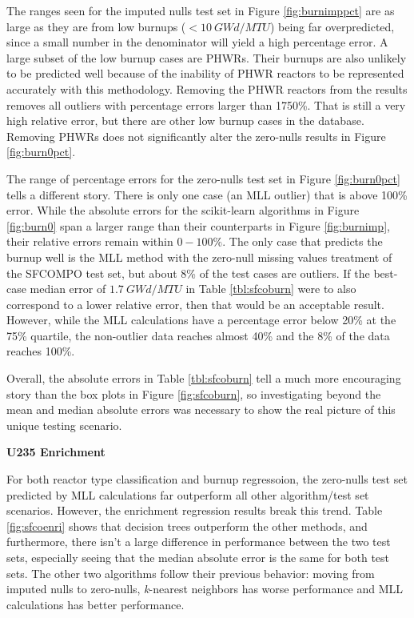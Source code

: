 The ranges seen for the imputed nulls test set in Figure \ref{fig:burnimppct}
are as large as they are from low burnups ($< 10\:GWd/MTU$) being far
overpredicted, since a small number in the denominator will yield a high
percentage error. A large subset of the low burnup cases are \gls{PHWR}s.
Their burnups are also unlikely to be predicted well because of the inability
of \gls{PHWR} reactors to be represented accurately with this methodology.
Removing the \gls{PHWR} reactors from the results removes all outliers with
percentage errors larger than 1750\%. That is still a very high relative error,
but there are other low burnup cases in the database.  Removing \gls{PHWR}s
does not significantly alter the zero-nulls results in Figure
\ref{fig:burn0pct}.

The range of percentage errors for the zero-nulls test set in Figure
\ref{fig:burn0pct} tells a different story. There is only one case (an
\gls{MLL} outlier) that is above 100\% error.  While the absolute errors for
the scikit-learn algorithms in Figure \ref{fig:burn0} span a larger range than
their counterparts in Figure \ref{fig:burnimp}, their relative errors remain
within $0-100\%$. The only case that predicts the burnup well is the \gls{MLL}
method with the zero-null missing values treatment of the \gls{SFCOMPO} test
set, but about 8\% of the test cases are outliers.  If the best-case median
error of $1.7\:GWd/MTU$ in Table \ref{tbl:sfcoburn} were to also correspond to a
lower relative error, then that would be an acceptable result.  However, while
the \gls{MLL} calculations have a percentage error below 20\% at the 75\%
quartile, the non-outlier data reaches almost 40\% and the 8\% of the data
reaches 100\%.

Overall, the absolute errors in Table \ref{tbl:sfcoburn} tell a much more
encouraging story than the box plots in Figure \ref{fig:sfcoburn}, so
investigating beyond the mean and median absolute errors was necessary to show
the real picture of this unique testing scenario. 

\noindent \textbf{\gls{U235} Enrichment}

For both reactor type classification and burnup regressoion, the zero-nulls
test set predicted by \gls{MLL} calculations far outperform all other
algorithm/test set scenarios. However, the enrichment regression results break
this trend.  Table \ref{fig:sfcoenri} shows that decision trees outperform the
other methods, and furthermore, there isn't a large difference in performance
between the two test sets, especially seeing that the median absolute error is
the same for both test sets.  The other two algorithms follow their previous
behavior: moving from imputed nulls to zero-nulls, \textit{k}-nearest neighbors
has worse performance and \gls{MLL} calculations has better performance.

